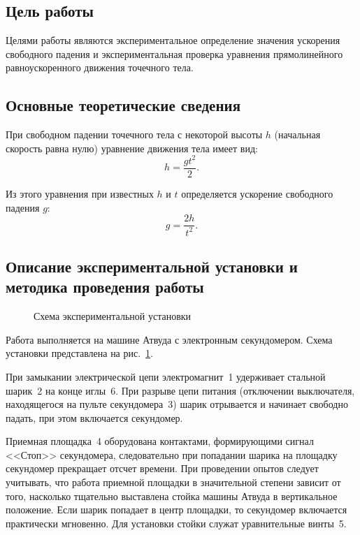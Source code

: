 \documentclass[a4paper, 12pt]{extarticle}
\begin{document}
\MTDTitlePage
\MTDInfoPage

\setcounter{section}{1}

\subsection{Цель работы}
Целями работы являются экспериментальное определение значения ускорения свободного падения и экспериментальная проверка уравнения прямолинейного равноускоренного движения точечного тела. 

\subsection{Основные теоретические сведения}
При свободном падении точечного тела с некоторой высоты $h$ (начальная скорость равна нулю) уравнение движения тела имеет вид: %
\begin{equation}
\label{eq:free-fall-h}
h = \frac{gt^2}{2}.
\end{equation}

Из этого уравнения при известных $h$ и $t$ определяется ускорение свободного падения $g$: %
\begin{equation}
\label{eq:free-fall-g}
g = \frac{2h}{t^2}.
\end{equation}

\subsection{Описание экспериментальной установки и методика проведения работы}
\begin{figure}[h] %
\caption{Схема экспериментальной установки \label{fig:atwood-machine}}
\end{figure}
Работа выполняется на машине Атвуда с электронным секундомером. Схема установки представлена на рис.~\ref{fig:atwood-machine}. %

При замыкании электрической цепи электромагнит~1 удерживает стальной шарик~2 на конце иглы~6. При разрыве цепи питания (отключении выключателя, находящегося на пульте секундомера~3) шарик отрывается и начинает свободно падать, при этом включается секундомер. %

Приемная площадка~4 оборудована контактами, формирующими сигнал <<Стоп>> секундомера, следовательно при попадании шарика на площадку секундомер прекращает отсчет времени. При проведении опытов следует учитывать, что работа приемной площадки в значительной степени зависит от того, насколько тщательно выставлена стойка машины Атвуда в вертикальное положение. Если шарик попадает в центр площадки, то секундомер включается практически мгновенно. Для установки стойки служат уравнительные винты~5. 
\end{document}

